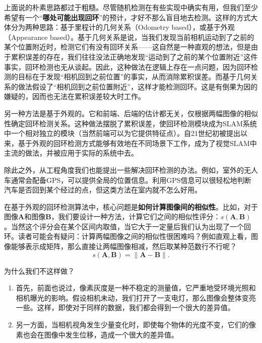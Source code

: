 上面说的朴素思路都过于粗糙。尽管随机检测在有些实现中确实有用\textsuperscript{\cite{Endres2014}}，但我们至少希望有一个“\textbf{哪处可能出现回环}”的预计，才好不那么盲目地去检测。这样的方式大体分为两种思路：基于里程计的几何关系（Odometry based），或基于外观（Appearance based）。基于几何关系是说，当我们发现当前相机运动到了之前的某个位置附近时，检测它们有没有回环关系\textsuperscript{\cite{Hahnel2003}}——这自然是一种直观的想法，但是由于累积误差的存在，我们往往没法正确地发现“运动到了之前的某个位置附近”这件事实，回环检测也无从谈起。因此，这种做法在逻辑上存在一点问题，因为回环检测的目标在于发现“相机回到之前位置”的事实，从而消除累积误差。而基于几何关系的做法假设了“相机回到之前位置附近”，这样才能检测回环。这是有倒果为因的嫌疑的，因而也无法在累积误差较大时工作\textsuperscript{\cite{Beeson2010}}。

另一种方法是基于外观的。它和前端、后端的估计都无关，仅根据两幅图像的相似性确定回环检测关系。这种做法摆脱了累积误差，使回环检测模块成为SLAM系统中一个相对独立的模块（当然前端可以为它提供特征点）。自21世纪初被提出以来，基于外观的回环检测方式能够有效地在不同场景下工作，成为了视觉SLAM中主流的做法，并被应用于实际的系统中去\textsuperscript{\cite{Ulrich2000, Latif2013, Mur-Artal2015}}。

除此之外，从工程角度我们也能提出一些解决回环检测的办法。例如，室外的无人车通常会配备GPS，可以提供全局的位置信息。利用GPS信息可以很轻松地判断汽车是否回到某个经过的点，但这类方法在室内就不怎么好用。

在基于外观的回环检测算法中，核心问题是\textbf{如何计算图像间的相似性}。比如，对于图像$\bm{A}$和图像$\bm{B}$，我们要设计一种方法，计算它们之间的相似性评分：$s(\bm{A}, \bm{B})$。当然这个评分会在某个区间内取值，当它大于一定量后我们认为出现了一个回环。读者可能会有疑问：计算两幅图像之间的相似性很困难吗？例如直观上看，图像能够表示成矩阵，那么直接让两幅图像相减，然后取某种范数行不行呢？
\clearpage
\begin{equation}
s(\bm{A}, \bm{B}) = \| \bm{A}-\bm{B} \|.
\end{equation}

为什么我们不这样做？

\begin{enumerate}
	\item 首先，前面也说过，像素灰度是一种不稳定的测量值，它严重地受环境光照和相机曝光的影响。假设相机未动，我们打开了一支电灯，那么图像会整体变亮一些。这样，即使对于同样的数据，我们都会得到一个很大的差异值。
	\item 另一方面，当相机视角发生少量变化时，即使每个物体的光度不变，它们的像素也会在图像中发生位移，造成一个很大的差异值。
\end{enumerate}

